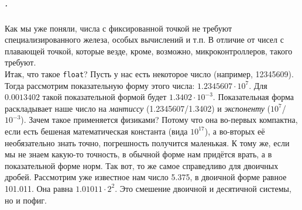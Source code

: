 \documentclass{article}
\begin{document}
    \subparagraph{.}
    Как мы уже поняли, числа с фиксированной точкой не требуют специализированного железа, особых вычислений и т.п. В отличие от чисел с плавающей точкой, которые везде, кроме, возможно, микроконтроллеров, такого требуют.\\
    Итак, что такое \texttt{float}? Пусть у нас есть некоторое число (например, 12345609). Тогда рассмотрим показательную форму этого числа: $1.2345607\cdot10^7$. Для $0.0013402$ такой показательной формой будет $1.3402\cdot10^{-3}$. Показательная форма раскладывает наше число на \textit{мантиссу} (1.2345607/1.3402) и \textit{экспоненту} ($10^7$/$10^{-3}$). Зачем такое применяется физиками? Потому что она во-первых компактна, если есть бешеная математическая константа (вида $10^{17}$), а во-вторых её необязательно знать точно, погрешность получится маленькая. К тому же, если мы не знаем какую-то точность, в обычной форме нам придётся врать, а в показательной форме норм. Так вот, то же самое справедливо для двоичных дробей. Рассмотрим уже известное нам число 5.375, в двоичной форме равное 101.011. Она равна $1.01011\cdot2^2$. Это смешение двоичной и десятичной системы, но и пофиг.\\
\end{document}
